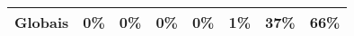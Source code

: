 \begin{table}[ht!]
{\begin{tabular}{l|ccccccc}
            Globais                                                     & 0\%                                                        & 0\%                                                     & 0\%                                                     & 0\%                                                     & \cellcolor[HTML]{FFDFA0}1\%                             & \cellcolor[HTML]{FFDFA0}37\%                            & \cellcolor[HTML]{FFC656}66\%                            \\ \hline
        \end{tabular}%
    }
\end{table}